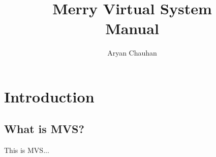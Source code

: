 \documentclass[twoside, 12pt, letterpaper]{book}
\title{Merry Virtual System \\ Manual}
\author{Aryan Chauhan}
\begin{document}
\chapter{Introduction}

\section{What is MVS?}
This is MVS...
\end{document}
